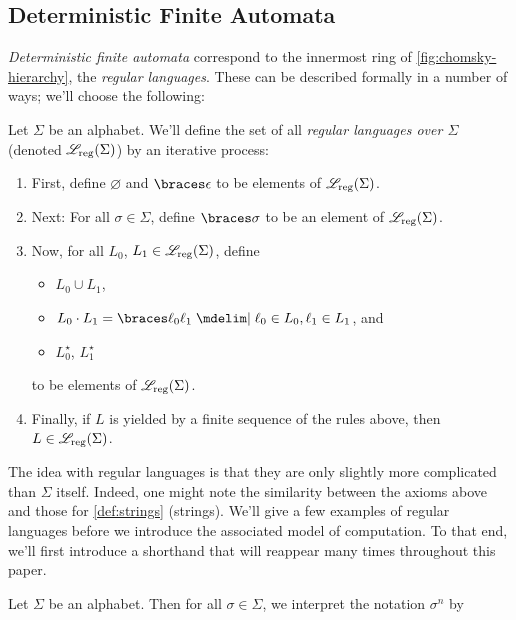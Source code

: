 \documentclass{fkpaper}
\newcommand{\lreg}{\ensuremath{\ms L_{\rm reg}}}
\begin{document}
\begin{multicols}{2}
  \subsection{Deterministic Finite Automata}
  \emph{Deterministic finite automata} correspond to the innermost ring
  of \cref{fig:chomsky-hierarchy}, the \emph{regular languages}. These
  can be described formally in a number of ways; we'll choose the
  following:
  \begin{definition}\label{def:regular-language}
    Let $\Sigma$ be an alphabet. We'll define the set of all
    \emph{regular languages over $\Sigma$} (denoted $\lreg(\Sigma)$) by
    an iterative process:
    \begin{enumerate}
      \item First, define $\varnothing$ and $\set{\epsilon}$ to be
        elements of $\lreg(\Sigma)$.
      \item Next: For all $\sigma \in \Sigma$, define $\set{\sigma}$ to
        be an element of $\lreg(\Sigma)$.
      \item Now, for all $L_0$, $L_1 \in \lreg(\Sigma)$, define
        \begin{itemize}
          \item $L_0 \cup L_1$, %
          \item $L_0 \cdot L_1 = \set{\ell_0 \ell_1 \MID \ell_0 \in L_0,
            \ell_1 \in L_1}$, and
          \item $L_0^\star$, $L_1^\star$
        \end{itemize}
        to be elements of $\lreg(\Sigma)$.
      \item Finally, if $L$ is yielded by a finite sequence of the
        rules above, then $L \in \lreg(\Sigma)$. \qedhere
    \end{enumerate}
  \end{definition}
  The idea with regular languages is that they are only slightly more
  complicated than $\Sigma$ itself. Indeed, one might note the
  similarity between the axioms above and those for \cref{def:strings}
  (strings). We'll give a few examples of regular languages before we
  introduce the associated model of computation. To that end, we'll
  first introduce a shorthand that will reappear many times throughout
  this paper.
  \begin{definition}
    Let $\Sigma$ be an alphabet. Then for all $\sigma \in \Sigma$, we
    interpret the notation $\sigma^n$ by
    \[
\]
\end{definition}
\end{multicols}
\end{document}
